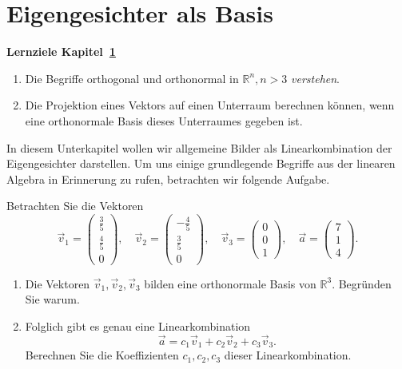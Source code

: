 \section{Eigengesichter als Basis} \label{sec:eigenbasis}
\begin{tcolorbox}
	\centerline{\textbf{Lernziele Kapitel~\ref{sec:eigenbasis}}}
	\begin{enumerate}[leftmargin=*,label=\thesection.\arabic*]
		\item Die Begriffe \glqq{}orthogonal\grqq{} und \glqq{}orthonormal\grqq{} in $\mathbb R^n,n>3$ \textit{verstehen}.
		\item Die Projektion eines Vektors auf einen Unterraum berechnen können, wenn eine orthonormale Basis dieses Unterraumes gegeben ist.
	\end{enumerate}
\end{tcolorbox}
In diesem Unterkapitel wollen wir allgemeine Bilder als Linearkombination der Eigengesichter darstellen.
Um uns einige grundlegende Begriffe aus der linearen Algebra in Erinnerung zu rufen, betrachten wir folgende Aufgabe.
\begin{aufgabe}
	Betrachten Sie die Vektoren
	\begin{equation*}
		\vec v_1=\begin{pmatrix}
			\tfrac{3}{5} \\ \tfrac{4}{5} \\ 0
		\end{pmatrix},\quad
		\vec v_2=\begin{pmatrix}
			-\tfrac{4}{5} \\ \tfrac{3}{5} \\  0
		\end{pmatrix},\quad
		\vec v_3=\begin{pmatrix}
			0 \\ 0 \\  1
		\end{pmatrix},\quad
		\vec a=\begin{pmatrix}
			7 \\ 1 \\  4
		\end{pmatrix}.
	\end{equation*}
	\begin{enumerate}[label=(\alph*)]
		\item Die Vektoren $\vec v_1,\vec v_2,\vec v_3$ bilden eine orthonormale Basis von $\mathbb R^3$.
		Begründen Sie warum.
		\item Folglich gibt es genau eine Linearkombination
		\begin{equation*}
			\vec a=c_1\vec v_1+c_2\vec v_2+c_3\vec v_3.
		\end{equation*}
		Berechnen Sie die Koeffizienten $c_1,c_2,c_3$ dieser Linearkombination.
	\end{enumerate}
\end{aufgabe}

